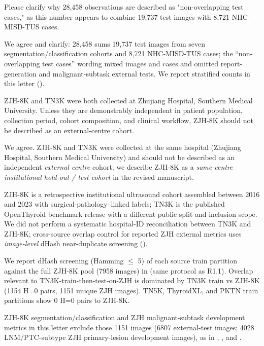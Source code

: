 \begin{reviewercomment}
Please clarify why 28,458 observations are described as "non-overlapping test cases," as this number appears to combine 19,737 test images with 8,721 NHC-MISD-TUS cases.
\end{reviewercomment}
\begin{authorresponse}
We agree and clarify: 28,458 sums 19,737 test images from seven segmentation/classification cohorts and 8,721 NHC-MISD-TUS cases; the ``non-overlapping test cases'' wording mixed images and cases and omitted report-generation and malignant-subtask external tests. We report stratified counts in this letter ().\par
\par
\end{authorresponse}

\begin{reviewercomment}
ZJH-8K and TN3K were both collected at Zhujiang Hospital, Southern Medical University. Unless they are demonstrably independent in patient population, collection period, cohort composition, and clinical workflow, ZJH-8K should not be described as an external-centre cohort.
\end{reviewercomment}
\begin{authorresponse}
We agree. ZJH-8K and TN3K were collected at the same hospital (Zhujiang Hospital, Southern Medical University) and should not be described as an independent \emph{external centre} cohort; we describe ZJH-8K as a \emph{same-centre institutional hold-out / test cohort} in the revised manuscript.\par
ZJH-8K is a retrospective institutional ultrasound cohort assembled between 2016 and 2023 with surgical-pathology--linked labels; TN3K is the published OpenThyroid benchmark release with a different public split and inclusion scope. We did not perform a systematic hospital-ID reconciliation between TN3K and ZJH-8K; cross-source overlap control for reported ZJH external metrics uses \emph{image-level} dHash near-duplicate screening ().\par
We report dHash screening (Hamming $\leq$ 5) of each source train partition against the full ZJH-8K pool (7958 images) in  (same protocol as R1.1). Overlap relevant to TN3K-train-then-test-on-ZJH is dominated by TN3K train vs ZJH-8K (1154 H=0 pairs, 1151 unique ZJH images). TN5K, ThyroidXL, and PKTN train partitions show 0 H=0 pairs to ZJH-8K.\par
ZJH-8K segmentation/classification and ZJH malignant-subtask development metrics in this letter exclude those 1151 images (6807 external-test images; 4028 LNM/PTC-subtype ZJH primary-lesion development images), as in , , and .\par
\par
\end{authorresponse}

